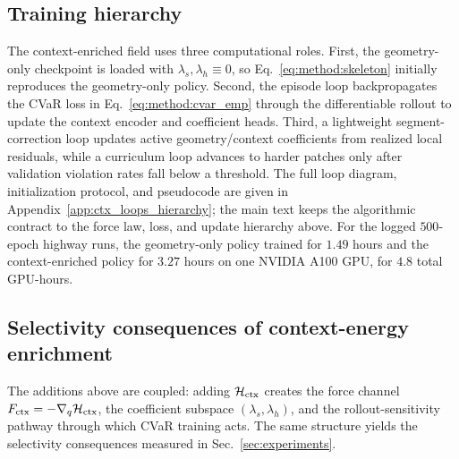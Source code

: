 \subsection{Training hierarchy}
\label{sec:method:loops}

The context-enriched field uses three computational roles.  First, the geometry-only checkpoint is
loaded with $\lambda_s,\lambda_h\equiv0$, so Eq.~\eqref{eq:method:skeleton}
initially reproduces the geometry-only policy.  Second, the episode loop
backpropagates the CVaR loss in Eq.~\eqref{eq:method:cvar_emp} through the
differentiable rollout to update the context encoder and coefficient heads.
Third, a lightweight segment-correction loop updates active geometry/context
coefficients from realized local residuals, while a curriculum loop advances
to harder patches only after validation violation rates fall below a threshold.
The full loop diagram, initialization protocol, and pseudocode are given in
Appendix~\ref{app:ctx_loops_hierarchy}; the main text keeps the algorithmic
contract to the force law, loss, and update hierarchy above.
For the logged $500$-epoch highway runs, the geometry-only policy trained for
$1.49$ hours and the context-enriched policy for $3.27$ hours on one NVIDIA
A100 GPU, for $4.8$ total GPU-hours.

\subsection{Selectivity consequences of context-energy enrichment}
\label{sec:method:enrichment}

The additions above are coupled: adding $\mathcal{H}_{\rm ctx}$ creates the force
channel $F_{\rm ctx}=-\nabla_q\mathcal{H}_{\rm ctx}$, the coefficient subspace
$(\lambda_s,\lambda_h)$, and the rollout-sensitivity pathway through which
CVaR training acts.  The same structure yields the selectivity consequences
measured in Sec.~\ref{sec:experiments}.

